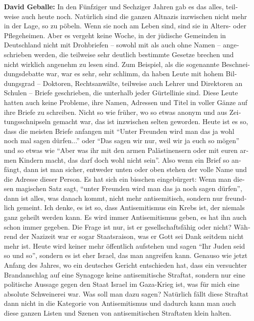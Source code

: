 \begin{otherlanguage}{ngerman}
\textbf{David Geballe:} In den Fünfziger und Sechziger Jahren gab es das alles, teilweise auch heute noch. Natürlich sind die ganzen Altnazis inzwischen nicht mehr in der Lage, so zu pöbeln. Wenn sie noch am Leben sind, sind sie in Alters- oder Pflegeheimen. Aber es vergeht keine Woche, in der jüdische Gemeinden in Deutschland nicht mit Drohbriefen – sowohl mit als auch ohne Namen – angeschrieben werden, die teilweise sehr deutlich bestimmte Gesetze brechen und nicht wirklich angenehm zu lesen sind. Zum Beispiel, als die sogenannte Beschneidungsdebatte war, war es sehr, sehr schlimm, da haben Leute mit hohem Bildungsgrad – Doktoren, Rechtsanwälte, teilweise auch Lehrer und Direktoren an Schulen – Briefe geschrieben, die unterhalb jeder Gürtellinie sind. Diese Leute hatten auch keine Probleme, ihre Namen, Adressen und Titel in voller Gänze auf ihre Briefe zu schreiben. Nicht so wie früher, wo so etwas anonym und aus Zeitungsschnipseln gemacht war, das ist inzwischen selten geworden. Heute ist es so, dass die meisten Briefe anfangen mit "`Unter Freunden wird man das ja wohl noch mal sagen dürfen..."' oder "`Das sagen wir nur, weil wir ja euch so mögen"' und so etwas wie "`Aber was ihr mit den armen Palästinensern oder mit euren armen Kindern macht, das darf doch wohl nicht sein"'. Also wenn ein Brief so anfängt, dann ist man sicher, entweder unten oder oben stehen der volle Name und die Adresse dieser Person. Es hat sich ein bisschen eingebürgert: Wenn man diesen magischen Satz sagt, "`unter Freunden wird man das ja noch sagen dürfen"', dann ist alles, was danach kommt, nicht mehr antisemitisch, sondern nur freundlich gemeint. 
Ich denke, es ist so, dass Antisemitismus ein Krebs ist, der niemals ganz geheilt werden kann. Es wird immer Antisemitismus geben, es hat ihn auch schon immer gegeben. Die Frage ist nur, ist er gesellschaftsfähig oder nicht? Während der Nazizeit war er sogar Staatsraison, was er Gott sei Dank seitdem nicht mehr ist. Heute wird keiner mehr öffentlich aufstehen und sagen "`Ihr Juden seid so und so"', sondern es ist eher Israel, das man angreifen kann. Genauso wie jetzt Anfang des Jahres, wo ein deutsches Gericht entschieden hat, dass ein versuchter Brandanschlag auf eine Synagoge keine antisemitische Straftat, sondern nur eine politische Aussage gegen den Staat Israel im Gaza-Krieg ist, was für mich eine absolute Schweinerei war. Was soll man dazu sagen? Natürlich fällt diese Straftat dann nicht in die Kategorie von Antisemitismus und dadurch kann man auch diese ganzen Listen und Szenen von antisemitischen Straftaten klein halten. 


\end{otherlanguage}
